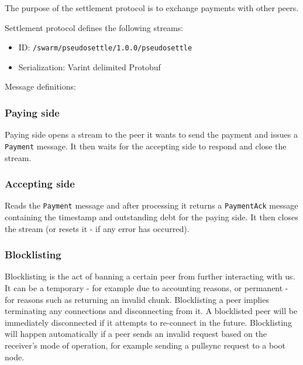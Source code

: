 The purpose of the settlement protocol is to exchange payments with
other peers.

Settlement protocol defines the following streams:
\begin{itemize}
    \item ID: \texttt{/swarm/pseudosettle/1.0.0/pseudosettle}
    \item Serialization: Varint delimited Protobuf
\end{itemize}

Message definitions:

\begin{Shaded}
\begin{Highlighting}[]
\NormalTok{;}


  \NormalTok{;}
\NormalTok{\}}

  \NormalTok{;}
  \NormalTok{;}
\NormalTok{\}}
\end{Highlighting}
\end{Shaded}

\subsubsection{Paying side}\label{paying-side}

Paying side opens a stream to the peer it wants to send the payment and issues a \texttt{Payment} message. It then waits for the accepting side to respond and close the stream.

\subsubsection{Accepting side}\label{accepting-side}

Reads the \texttt{Payment} message and after processing it returns a \texttt{PaymentAck} message containing the timestamp and outstanding debt for the paying side. It then closes the stream (or resets it - if any error has occurred).

\subsubsection{Blocklisting}\label{caching}

Blocklisting is the act of banning a certain peer from further interacting with us. It can be a temporary - for example due to accounting reasons, or permanent - for reasons such as returning an invalid chunk. Blocklisting a peer implies terminating any connections and disconnecting from it. A blocklisted peer will be immediately disconnected if it attempts to re-connect in the future.
Blocklisting will happen automatically if a peer sends an invalid request based on the receiver's mode of operation, for example sending a pullsync request to a boot node.